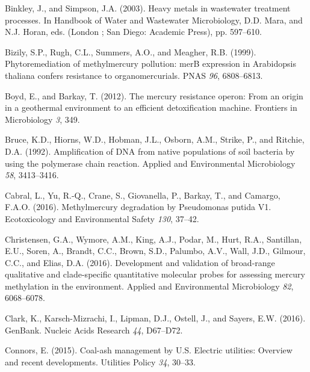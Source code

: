 \documentclass[ms, hidelinks]{uncgdissertationexp}
\theoremstyle{plain}
\theoremstyle{definition}
\theoremstyle{remark}
\begin{document}
\leavevmode\hypertarget{ref-binkleyHeavyMetalsWastewater2003}{}%
Binkley, J., and Simpson, J.A. (2003). Heavy metals in wastewater treatment processes. In Handbook of Water and Wastewater Microbiology, D.D. Mara, and N.J. Horan, eds. (London ; San Diego: Academic Press), pp. 597--610.

\leavevmode\hypertarget{ref-bizilyPhytoremediationMethylmercuryPollution1999}{}%
Bizily, S.P., Rugh, C.L., Summers, A.O., and Meagher, R.B. (1999). Phytoremediation of methylmercury pollution: merB expression in Arabidopsis thaliana confers resistance to organomercurials. PNAS \emph{96}, 6808--6813.

\leavevmode\hypertarget{ref-boydMercuryResistanceOperon2012}{}%
Boyd, E., and Barkay, T. (2012). The mercury resistance operon: From an origin in a geothermal environment to an efficient detoxification machine. Frontiers in Microbiology \emph{3}, 349.

\leavevmode\hypertarget{ref-bruceAmplificationDNANative1992}{}%
Bruce, K.D., Hiorns, W.D., Hobman, J.L., Osborn, A.M., Strike, P., and Ritchie, D.A. (1992). Amplification of DNA from native populations of soil bacteria by using the polymerase chain reaction. Applied and Environmental Microbiology \emph{58}, 3413--3416.

\leavevmode\hypertarget{ref-cabralMethylmercuryDegradationPseudomonas2016}{}%
Cabral, L., Yu, R.-Q., Crane, S., Giovanella, P., Barkay, T., and Camargo, F.A.O. (2016). Methylmercury degradation by Pseudomonas putida V1. Ecotoxicology and Environmental Safety \emph{130}, 37--42.

\leavevmode\hypertarget{ref-christensenDevelopmentValidationBroadrange2016}{}%
Christensen, G.A., Wymore, A.M., King, A.J., Podar, M., Hurt, R.A., Santillan, E.U., Soren, A., Brandt, C.C., Brown, S.D., Palumbo, A.V., Wall, J.D., Gilmour, C.C., and Elias, D.A. (2016). Development and validation of broad-range qualitative and clade-specific quantitative molecular probes for assessing mercury methylation in the environment. Applied and Environmental Microbiology \emph{82}, 6068--6078.

\leavevmode\hypertarget{ref-clarkGenBank2016}{}%
Clark, K., Karsch-Mizrachi, I., Lipman, D.J., Ostell, J., and Sayers, E.W. (2016). GenBank. Nucleic Acids Research \emph{44}, D67--D72.

\leavevmode\hypertarget{ref-connorsCoalashManagementElectric2015}{}%
Connors, E. (2015). Coal-ash management by U.S. Electric utilities: Overview and recent developments. Utilities Policy \emph{34}, 30--33.
\end{document}
